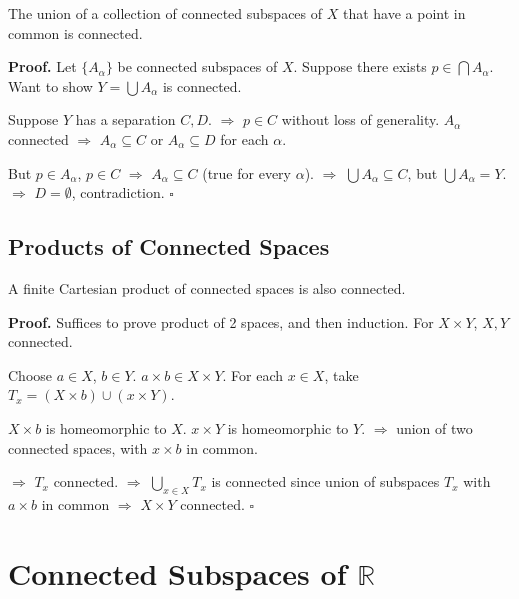 \documentclass[11pt]{report}
\renewenvironment{proof}[1][Proof]{\noindent\textbf{#1.} }{\hfill$\square$\par\vspace{5pt}}
\begin{document}
\begin{thmbox}
The union of a collection of connected subspaces of $X$ that have a point in common is connected.
\end{thmbox}

\begin{proof}
Let $\{A_\alpha\}$ be connected subspaces of $X$. Suppose there exists $p \in \bigcap A_\alpha$. Want to show $Y = \bigcup A_\alpha$ is connected.

Suppose $Y$ has a separation $C, D$. $\Rightarrow$ $p \in C$ without loss of generality. $A_\alpha$ connected $\Rightarrow$ $A_\alpha \subseteq C$ or $A_\alpha \subseteq D$ for each $\alpha$.

But $p \in A_\alpha$, $p \in C$ $\Rightarrow$ $A_\alpha \subseteq C$ (true for every $\alpha$). $\Rightarrow$ $\bigcup A_\alpha \subseteq C$, but $\bigcup A_\alpha = Y$. $\Rightarrow$ $D = \emptyset$, contradiction.
\end{proof}

\subsection{Products of Connected Spaces}

\begin{thmbox}
A finite Cartesian product of connected spaces is also connected.
\end{thmbox}

\begin{proof}
Suffices to prove product of 2 spaces, and then induction. For $X \times Y$, $X, Y$ connected.

Choose $a \in X$, $b \in Y$. $a \times b \in X \times Y$. For each $x \in X$, take $T_x = (X \times b) \cup (x \times Y)$.

$X \times b$ is homeomorphic to $X$. $x \times Y$ is homeomorphic to $Y$. $\Rightarrow$ union of two connected spaces, with $x \times b$ in common.

$\Rightarrow$ $T_x$ connected. $\Rightarrow$ $\bigcup_{x \in X} T_x$ is connected since union of subspaces $T_x$ with $a \times b$ in common $\Rightarrow$ $X \times Y$ connected.
\end{proof}

\section{Connected Subspaces of $\mathbb{R}$}
\end{document}
